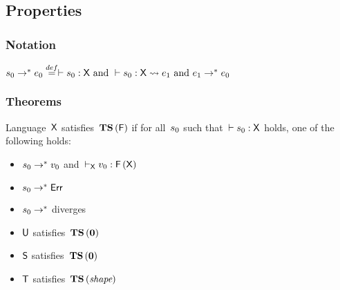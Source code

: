 \documentclass[nonacm,10pt]{acmart}
\begin{document}
\begin{mathpar}




\end{mathpar}


\subsection{Properties}

\subsubsection{Notation}

$\ssurface_0 \srr \sexpr_0
 \sdefeq
 \vdash \ssurface_0 : \stspec
  \mbox{ and } \vdash \ssurface_0 : \stspec \scompile \sexpr_1
  \mbox{ and } \sexpr_1 \srr \sexpr_0$


\subsubsection{Theorems}

\begin{theorem}[TS$(\sX,\stypemap)$]
  Language\ $\sX$
  satisfies\ $\fTS{\stypemap}$
  if for all\ $\ssurface_0$
  such that\ $\vdash \ssurface_0 : \stspec$
  holds, one of the following holds:
  \begin{itemize}
    \item $\ssurface_0 \srr \svalue_0$ and\ $\sWTX \svalue_0 : \ftypemap{\stspec}$
    \item $\ssurface_0 \srr \serror$
    \item $\ssurface_0 \srr$ diverges
  \end{itemize}
\end{theorem}

\begin{theorem}\leavevmode
  \begin{itemize}
    \item $\sU$ satisfies\ $\fTS{\stypemapzero}$
    \item $\sS$ satisfies\ $\fTS{\stypemapshape}$
    \item $\sT$ satisfies\ $\fTS{\stypemapone}$
  \end{itemize}
\end{theorem}
\end{document}
